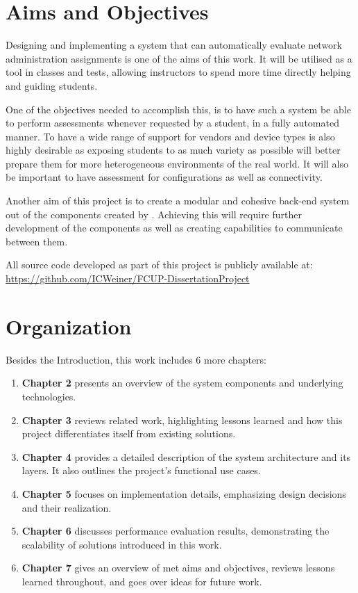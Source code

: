 \section{Aims and Objectives}

  Designing and implementing a system that can automatically evaluate network administration assignments is one of the aims 
  of this work. It will be utilised as a tool in classes and tests, allowing instructors to spend more time directly helping 
  and guiding students.

  One of the objectives needed to accomplish this, is to have such a system be able to perform assessments whenever requested 
  by a student, in a fully automated manner.
  To have a wide range of support for vendors and device types is also highly desirable as exposing students to as much 
  variety as possible will better prepare them for more heterogeneous environments of the real world.
  It will also be important to have assessment for configurations as well as connectivity.

  Another aim of this project is to create a modular and cohesive back-end system out of the components created by 
  \citet{santos2024}.
  Achieving this will require further development of the components as well as creating capabilities to communicate between 
  them.

  All source code developed as part of this project is publicly available at: \url{https://github.com/ICWeiner/FCUP-DissertationProject}

\section{Organization}

  Besides the Introduction, this work includes 6 more chapters:

  \begin{enumerate}
      \item \textbf{Chapter 2} presents an overview of the system components and underlying technologies.
      \item \textbf{Chapter 3} reviews related work, highlighting lessons learned and how this project differentiates itself from existing solutions.
      \item \textbf{Chapter 4} provides a detailed description of the system architecture and its layers. It also outlines the project's functional use cases.
      \item \textbf{Chapter 5} focuses on implementation details, emphasizing design decisions and their realization.
      \item \textbf{Chapter 6} discusses performance evaluation results, demonstrating the scalability of solutions introduced in this work.
      \item \textbf{Chapter 7} gives an overview of met aims and objectives, reviews lessons learned throughout, and goes 
      over ideas for future work.
  \end{enumerate}